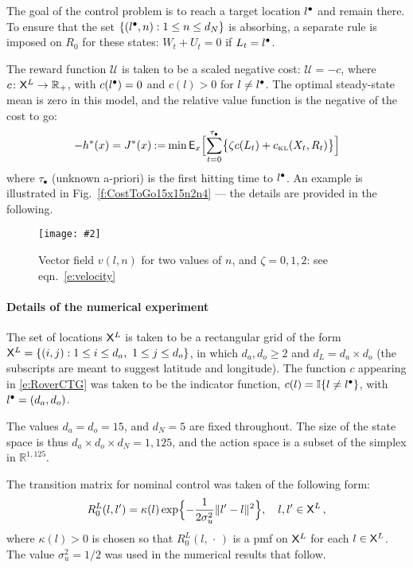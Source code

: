 \documentclass[final,12pt]{colt2018} %
\def\util{{\mathcal{U}}}
\def\cKL{c_{\text{\tiny KL}}}
\newcommand{\field}[1]{\mathbb{#1}}
\def\Re{\field{R}}
\def\ind{\field{I}}
\def\eqdef{\mathbin{:=}}
\def\Expect{{\sf E}}
\def\varble{\,\cdot\,}
\def\Ebox#1#2{%
\begin{center}
\texttt{[image: \#2]} \end{center}}
\def\Fig#1{Fig.~\ref{#1}}
\def\ind{\field{I}}
\def\Re{\field{R}}
\begin{document}
The goal of the control problem is to reach a target location $l^{\bullet}$ and remain there.  To ensure that the set $\{ (l^{\bullet},n) :  1\le n\le d_N\}$ is absorbing, a separate rule is imposed on $R_0$ for these states:   $W_t + U_t  =0$ if $L_t = l^{\bullet}$.

The reward function $\util$ is taken to be a scaled negative cost:  $ \util = -  c$,  where $c\colon\stateL\to\Re_+$,
with $c(l^{\bullet})=0$ and $c(l)>0$ for $l\neq l^{\bullet}$.    The optimal steady-state mean is zero in this model, and the relative value function is the negative of the cost to go:
\begin{equation}
-h^*(x) = 
J^*(x) \eqdef \min\Expect_x\Bigl[\sum_{t=0}^{\tau_\bullet} 
	\bigl\{\zeta c(L_t) +\cKL(X_t,R_t ) \bigr \} \Bigr]
\label{e:RoverCTG}
\end{equation}
where $\tau_\bullet$  (unknown a-priori) is the first hitting time to $l^{\bullet}$.   An example is illustrated in \Fig{f:CostToGo15x15n2n4} --- the details are provided in the following.


 

 \begin{figure}[h]
\Ebox{.9}{Quiver15by15n2n4.pdf} 
\vspace{-3ex}
\caption{\small Vector field $v(l,n)$ for two values of $n$, and $\zeta=0,1,2$:  see eqn.~\eqref{e:velocity}}
\label{f:Quiver15by15n2n4.pdf}
\vspace{-.25ex}
\end{figure} 

 
\paragraph{Details of the numerical experiment}

The  set of locations $\stateL$ is taken to be a rectangular grid of the form $\stateL = \{ (i,j) : 1\le i\le d_a,\  1\le j \le d_o\}$, in which   $d_a, d_o\ge 2$ and $d_L=d_a\times d_o$  (the subscripts are  meant to suggest latitude and longitude).  The function $c$ appearing in \eqref{e:RoverCTG} was taken to be the indicator function,  $c(l)=\ind\{l\neq \Ltarget\}$,  with $l^{\bullet}=(d_a,d_o)$.


The values  $d_a=d_o=15$, and $d_N=5$ are fixed throughout.
The size of the state space is thus $d_a\times d_o\times d_N= 1,125$,  and the action space is a subset of the simplex in $\Re^{1,125}$.  




The transition matrix for nominal control was taken   of the following form:
\[
R_0^L(l, l')   = \kappa(l)   \exp\Bigl\{-\frac{1}{2\sigma^2_u} \| l'-l\|^2 \Bigr\}  ,\quad l,l'\in\stateL\,,
\]
where $\kappa(l) >0$ is chosen so that $R_0^L(l, \varble)$ is a pmf on $\stateL$ for each $l\in\stateL$.   The value $\sigma^2_u = 1/2$ was used in the numerical results that follow.
\end{document}
